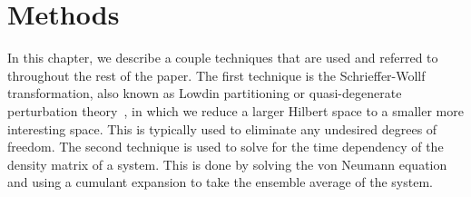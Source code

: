 \chapter{Methods}\label{CH:methods}

In this chapter, we describe a couple techniques that are used and referred to throughout the rest of the paper.
The first technique is the Schrieffer-Wollf transformation, also known as Lowdin partitioning or quasi-degenerate perturbation theory~\cite{winkler_2003}, in which we reduce a larger Hilbert space to a smaller more interesting space.
This is typically used to eliminate any undesired degrees of freedom.
The second technique is used to solve for the time dependency of the density matrix of a system.
This is done by solving the von Neumann equation and using a cumulant expansion to take the ensemble average of the system.






